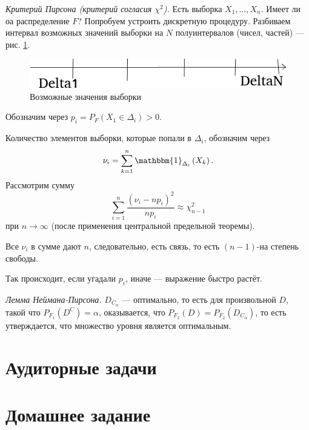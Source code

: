 \textit{Критерий Пирсона (критерий согласия $ \chi^2$).} Есть выборка $X_1, \dotsc, X_n$.
Имеет ли оа распределение $F$?
Попробуем устроить дискретную процедуру.
Разбиваем интервал возможных значений выборки на $N$ полуинтервалов (чисел, частей) ---
рис. \ref{fig:12}.

\begin{figure}[h!]
  \centering
  \includegraphics[width=.4\textwidth]{./pictures/12.png}
  \caption{Возможные значения выборки}
  \label{fig:12}
\end{figure}

Обозначим через $p_i = P_F \left( X_1 \in \Delta_i \right) > 0$.

Количество элементов выборки, которые попали в $ \Delta_i$, обозначим через
$$ \nu_i =
  \sum \limits_{k = 1}^n \mathbbm{1}_{ \Delta_i} \left( X_k \right).$$
Рассмотрим сумму
$$ \sum \limits_{i = 1}^n \frac{ \left( \nu_i - np_i \right)^2}{np_i} \approx
  \chi_{n - 1}^2$$
при $n \to \infty $ (после применения центральной предельной теоремы).

Все $ \nu_i$ в сумме дают $n$, следовательно, есть связь,
то есть $ \left( n - 1 \right) $-на степень свободы.

Так происходит, если угадали $p_i$, иначе --- выражение быстро растёт.

\textit{Лемма Неймана-Пирсона.}
$D_{C_{ \alpha }}$ --- оптимально, то есть для произвольной $D$,
такой что $P_{F_1} \left( D^C \right) = \alpha $, оказывается,
что $P_{F_2} \left( D \right) = P_{F_2} \left( D_{C_{ \alpha }} \right) $, то есть утверждается,
что множество уровня является оптимальным.

\section*{Аудиторные задачи}

\section*{Домашнее задание}

